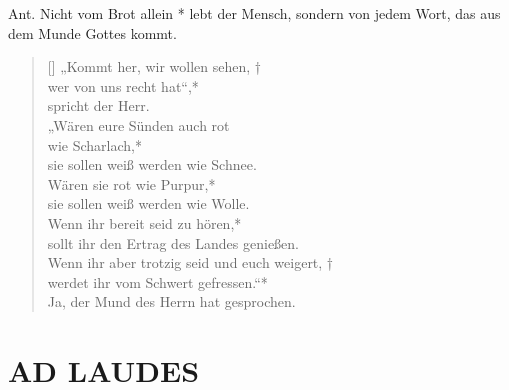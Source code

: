 \newpage


\vspace{0.2cm}


\def\greinitialformat#1{{\fontsize{40}{40}\selectfont #1}}
\gresetfirstlineaboveinitial{\small \textcolor{red}{Cant.}}{}
\setaboveinitialseparation{0.72mm}


\medskip

\begin{sloppypar}
{\noindent\rm{Ant. Nicht vom Brot allein * lebt der Mensch, sondern von jedem Wort, das aus dem Munde Gottes kommt.}}
\end{sloppypar}

\medskip

\begin{verse}[\versewidth]
„Kommt her, wir wollen sehen, † \\
wer von uns recht hat“,*\\
spricht der Herr.\\
\vin „Wären eure Sünden auch rot\\
\vin wie Scharlach,*\\
\vin sie sollen weiß werden wie Schnee.\\
Wären sie rot wie Purpur,*\\
sie sollen weiß werden wie Wolle.\\
\vin Wenn ihr bereit seid zu hören,*\\
\vin sollt ihr den Ertrag des Landes genießen.\\
Wenn ihr aber trotzig seid und euch weigert, †\\
werdet ihr vom Schwert gefressen.“*\\
Ja, der Mund des Herrn hat gesprochen.
 
\end{verse}

\begin{flushleft}


\end{flushleft}


\section[LAUDES]{AD LAUDES}

